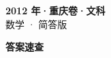 \documentclass[zihao=-4, a4paper]{ctexart}
\begin{document}
\begin{center}
  {\Large\bfseries 2012 年·重庆卷·文科}\\[4pt]
  {\large 数学 · 简答版}
\end{center}
\medskip
{}

\clearpage
{}
\begin{center}{\Large\bfseries 答案速查}\end{center}
\medskip

\end{document}
